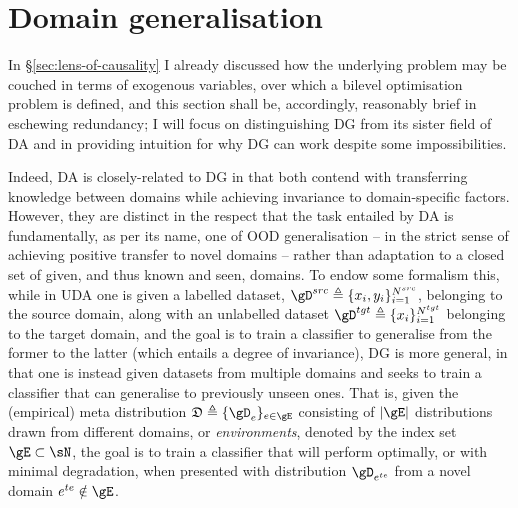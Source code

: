 \section{Domain generalisation}\label{sec:dg}
In \S\ref{sec:lens-of-causality} I already discussed how the underlying problem may be couched in
terms of exogenous variables, over which a bilevel optimisation problem is defined, and this
section shall be, accordingly, reasonably brief in eschewing redundancy; I will focus on
distinguishing \ac{DG} from its sister field of \ac{DA} and in providing intuition for why \ac{DG}
can work despite some impossibilities.


Indeed, \Acl{DA} is closely-related to \acl{DG} in that both contend with transferring knowledge
between domains while achieving invariance to domain-specific factors. 
%
However, they are distinct in the respect that the task entailed by \ac{DA} is fundamentally, as
per its name, one of \ac{OOD} generalisation -- in the strict sense of achieving positive transfer
to novel domains -- rather than adaptation to a closed set of given, and thus known and seen,
domains.
%
%
To endow some formalism this, while in \ac{UDA} one is given a labelled dataset, \( \gD^{src}
\triangleq \{x_i, y_i \}_{i=1}^{N^{src}} \), belonging to the source domain, along with an
unlabelled dataset \( \gD^{tgt} \triangleq \{ x_i \}_{i=1}^{N^{tgt}} \) belonging to the target
domain, and the goal is to train a classifier to generalise from the former to the latter (which
entails a degree of invariance), \ac{DG} is more general, in that one is instead given datasets
from multiple domains and seeks to train a classifier that can generalise to previously unseen
ones. 
%
That is, given the (empirical) meta distribution \( \mathfrak{D} \triangleq \{\gD_e \}_{e \in \gE}
\) consisting of \( |\gE| \) distributions drawn from different domains, or \emph{environments},
denoted by the index set \( \gE \subset \sN \), the goal is to train a classifier that will perform
optimally, or with minimal degradation, when presented with distribution \( \gD_{e^{te}} \) from a
novel domain \( e^{te} \notin  \gE \).

